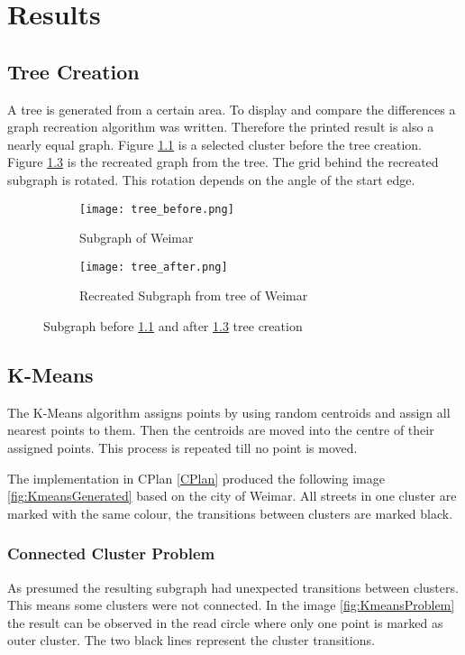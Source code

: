 \pagebreak
\chapter{Results}
\section{Tree Creation}
A tree is generated from a certain area. To display and compare the differences a graph recreation algorithm was written. Therefore the printed result is also a nearly equal graph. Figure \ref{fig:tree_example} is a selected cluster before the tree creation. Figure \ref{fig:tree_example_after} is the recreated graph from the tree. The grid behind the recreated subgraph is rotated. This rotation depends on the angle of the start edge.

\begin{figure}[ht]
    \centering
    \begin{subfigure}[b]{0.55\textwidth}
        \texttt{[image: tree\_before.png]}
        \caption{Subgraph of Weimar}
        \label{fig:tree_example}
    \end{subfigure}
    \quad
    \begin{subfigure}[b]{0.55\textwidth}
        \texttt{[image: tree\_after.png]}
        \caption{Recreated Subgraph from tree of Weimar}
        \label{fig:tree_example_after}
    \end{subfigure}
    \caption{Subgraph before \ref{fig:tree_example} and after \ref{fig:tree_example_after} tree creation}
\end{figure}

\FloatBarrier
\section{K-Means}
The K-Means algorithm assigns points by using random centroids and assign all nearest points to them. Then the centroids are moved into the centre of their assigned points. This process is repeated till no point is moved.

The implementation in CPlan \ref{CPlan} produced the following image \ref{fig:KmeansGenerated} based on the city of Weimar. All streets in one cluster are marked with the same colour, the transitions between clusters are marked black.

\subsection{Connected Cluster Problem}
As presumed the resulting subgraph had unexpected transitions between clusters. This means some clusters were not connected. In the image \ref{fig:KmeansProblem} the result can be observed in the read circle where only one point is marked as outer cluster. The two black lines represent the cluster transitions.

